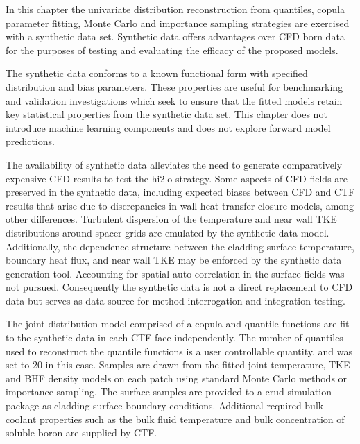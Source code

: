 
In this chapter the univariate distribution reconstruction from quantiles, copula parameter fitting, Monte Carlo and importance sampling strategies are exercised with a synthetic data set.  Synthetic data offers advantages over CFD born data for the purposes of testing and evaluating the efficacy of the proposed models.  

The synthetic data conforms to a known functional form with specified distribution and bias parameters. These properties are useful for benchmarking and validation investigations which seek to ensure that the fitted models retain key statistical properties from the synthetic data set. This chapter does not introduce machine learning components and does not explore forward model predictions.  %

The availability of synthetic data alleviates the need to generate comparatively expensive CFD results to test the hi2lo strategy.  Some aspects of CFD fields are preserved in the synthetic data, including expected biases between CFD and CTF results that arise due to discrepancies in wall heat transfer closure models, among other differences.  Turbulent dispersion of the temperature and near wall TKE distributions around spacer grids are emulated by the synthetic data model.  Additionally, the dependence structure between the cladding surface temperature, boundary heat flux, and near wall TKE may be enforced by the synthetic data generation tool.  Accounting for spatial auto-correlation in the surface fields was not pursued.    Consequently the synthetic data is not a direct replacement to CFD data but serves as data source for method interrogation and integration testing.

The joint distribution model comprised of a copula and quantile functions are fit to the synthetic data in each CTF face independently.  The number of quantiles used to reconstruct the quantile functions is a user controllable quantity, and was set to 20 in this case.  Samples are drawn from the fitted joint temperature, TKE and BHF density models on each patch using standard Monte Carlo methods or importance sampling.  The surface samples are provided to a crud simulation package as cladding-surface boundary conditions.  Additional required bulk coolant properties such as the bulk fluid temperature and bulk concentration of soluble boron are supplied by CTF.

